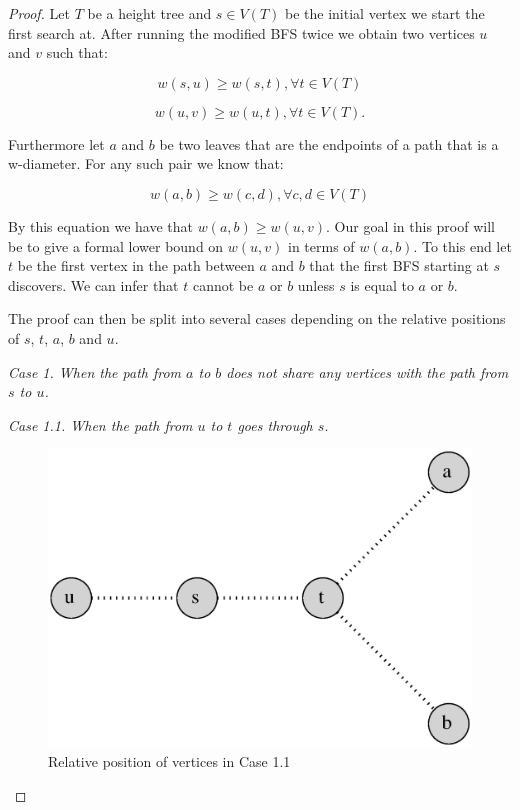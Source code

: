 \begin{proof}
Let $T$ be a height tree and $s \in V(T)$ be the initial vertex we start the first search at. After running the modified BFS twice we obtain two vertices $u$ and $v$ such that:

\begin{equation}
    \label{eq:su_all}
    w(s, u) \ge w(s, t), \forall t \in V(T)
\end{equation}

\begin{equation}
    \label{eq:uv_all}
    w(u, v) \ge w(u, t), \forall t \in V(T).
\end{equation}

Furthermore let $a$ and $b$ be two leaves that are the endpoints of a path that is a w-diameter. For any such pair we know that:

\begin{equation}
    \label{eq:ab_all}
    w(a, b) \ge w(c, d), \forall c, d \in V(T)
\end{equation}

By this equation we have that $w(a, b) \ge w(u, v)$. Our goal in this proof will be to give a formal lower bound on $w(u, v)$ in terms of $w(a, b)$. To this end let $t$ be the first vertex in the path between $a$ and $b$ that the first BFS starting at $s$ discovers. We can infer that $t$ cannot be $a$ or $b$ unless $s$ is equal to $a$ or $b$.

The proof can then be split into several cases depending on the relative positions of $s$, $t$, $a$, $b$ and $u$. \linebreak

{\em Case 1. When the path from $a$ to $b$ does not share any vertices with the path from $s$ to $u$.}

{\em Case 1.1. When the path from $u$ to $t$ goes through $s$.}



\begin{figure}%
    \centering
    \includegraphics[center, scale=0.5 ]{./images/2xbfs-case-1-1.eps}
    \caption{Relative position of vertices in Case 1.1 }%
    \label{fig:case1.1}%
\end{figure}


\end{proof}
